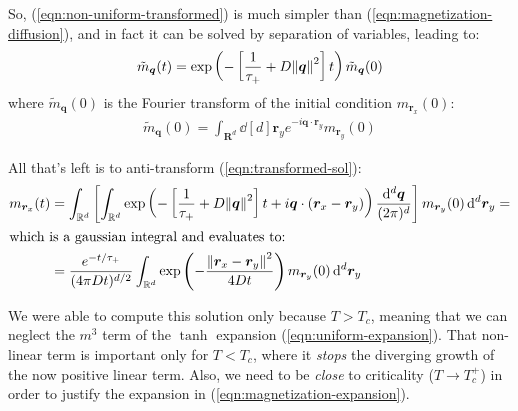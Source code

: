 \documentclass[../../main.tex]{subfiles}
\begin{document}
\medskip

So, (\ref{eqn:non-uniform-transformed}) is much simpler than (\ref{eqn:magnetization-diffusion}), and in fact it can be solved by separation of variables, leading to:
\begin{align}\label{eqn:transformed-sol}
    \tilde{m}_{\bm{q}}(t) = \exp\left(-\left[\frac{1}{\tau_+} + D \norm{\bm{q}}^2 \right] t\right) \tilde{m}_{\bm{q}}(0)
\end{align}
where $\tilde{m}_{\bm{q}}(0)$ is the Fourier transform of the initial condition $m_{\bm{r}_x}(0)$:
\begin{align*}
    \tilde{m}_{\bm{q}}(0) = \int_{\bm{R}^d} \dd[d]{\bm{r}_y} e^{-i \bm{q} \cdot \bm{r}_y} m_{\bm{r}_y}(0)
\end{align*}

All that's left is to anti-transform (\ref{eqn:transformed-sol}):
\begin{align}\nonumber
    m_{\bm{r}_x}(t) &= \int_{\mathbb{R}^d} \left[ \int_{\mathbb{R}^d} \exp\left(-\left[\frac{1}{\tau_+} + D \norm{\bm{q}}^2 \right] t + i \bm{q} \cdot (\bm{r}_x - \bm{r}_y)\right) \frac{\dd[d]{\bm{q}}}{(2\pi)^d} \right] m_{\bm{r}_y}(0) \dd[d]{\bm{r}_y} =\\
    \shortintertext{which is a gaussian integral and evaluates to:} \label{eqn:non-uniform-sol}
    &= \frac{e^{-t/\tau_+}}{(4 \pi D t)^{d/2}} \int_{\mathbb{R}^d} \exp\left(-\frac{\norm{\bm{r}_x - \bm{r}_y}^2}{4 D t} \right) m_{\bm{r}_y}(0) \dd[d]{\bm{r}_y}
\end{align}

We were able to compute this solution only because $T > T_c$, meaning that we can neglect the $m^3$ term of the $\tanh$ expansion (\ref{eqn:uniform-expansion}). That non-linear term is important only for $T < T_c$, where it \textit{stops} the diverging growth of the now positive linear term. Also, we need to be \textit{close} to criticality ($T \to T_c^+$) in order to justify the expansion in (\ref{eqn:magnetization-expansion}). 
\end{document}
